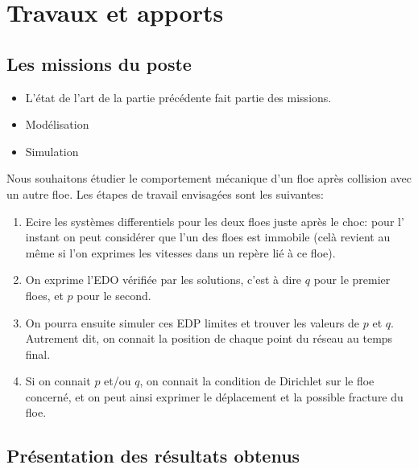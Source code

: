 
\chapter{Travaux et apports} %

\label{Chapter4} %




\section{Les missions du poste}

\begin{itemize}
    \item L'état de l'art de la partie précédente fait partie des missions.
    \item Modélisation
    \item Simulation
\end{itemize}

Nous souhaitons étudier le comportement mécanique d'un floe après collision avec un autre floe. Les étapes de travail envisagées sont les suivantes:
\begin{enumerate}
    \item Ecire les systèmes differentiels pour les deux floes juste après le choc: pour l' instant on peut considérer que l'un des floes est immobile (celà revient au même si l'on exprimes les vitesses dans un repère lié à ce floe).
    \item On exprime l'EDO vérifiée par les solutions, c'est à dire $q$ pour le premier floes, et $p$ pour le second.
    \item On pourra ensuite simuler ces EDP limites et trouver les valeurs de $p$ et $q$. Autrement dit, on connait la position de chaque point du réseau au temps final.
    \item Si on connait $p$ et/ou $q$, on connait la condition de Dirichlet sur le floe concerné, et on peut ainsi exprimer le déplacement et la possible fracture du floe. 
\end{enumerate}







\section{Présentation des résultats obtenus}





